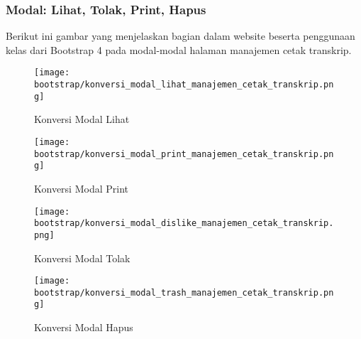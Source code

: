 \subsubsection{Modal: Lihat, Tolak, Print, Hapus}
\noindent Berikut ini gambar yang menjelaskan bagian dalam website beserta penggunaan kelas dari Bootstrap 4 pada modal-modal  halaman manajemen cetak transkrip.\\
\begin{figure} [H]
	\centering  
	\texttt{[image: bootstrap/konversi\_modal\_lihat\_manajemen\_cetak\_transkrip.png]}
	\caption{Konversi Modal Lihat} 
\end{figure}
\begin{figure} [H]
	\centering  
	\texttt{[image: bootstrap/konversi\_modal\_print\_manajemen\_cetak\_transkrip.png]}
	\caption{Konversi Modal Print} 
\end{figure}
\begin{figure} [H]
	\centering  
	\texttt{[image: bootstrap/konversi\_modal\_dislike\_manajemen\_cetak\_transkrip.png]}
	\caption{Konversi Modal Tolak} 
\end{figure}
\begin{figure} [H]
	\centering  
	\texttt{[image: bootstrap/konversi\_modal\_trash\_manajemen\_cetak\_transkrip.png]}
	\caption{Konversi Modal Hapus} 
\end{figure}


